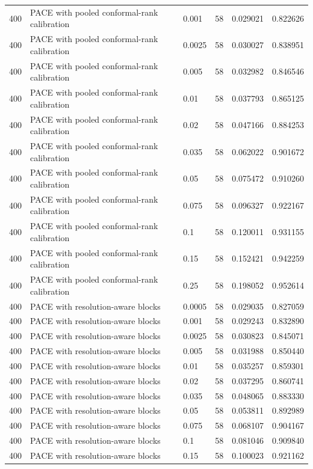 \begin{tabular}{llllll}
400 & PACE with pooled conformal-rank calibration & 0.001 & 58 & 0.029021 & 0.822626 \\
400 & PACE with pooled conformal-rank calibration & 0.0025 & 58 & 0.030027 & 0.838951 \\
400 & PACE with pooled conformal-rank calibration & 0.005 & 58 & 0.032982 & 0.846546 \\
400 & PACE with pooled conformal-rank calibration & 0.01 & 58 & 0.037793 & 0.865125 \\
400 & PACE with pooled conformal-rank calibration & 0.02 & 58 & 0.047166 & 0.884253 \\
400 & PACE with pooled conformal-rank calibration & 0.035 & 58 & 0.062022 & 0.901672 \\
400 & PACE with pooled conformal-rank calibration & 0.05 & 58 & 0.075472 & 0.910260 \\
400 & PACE with pooled conformal-rank calibration & 0.075 & 58 & 0.096327 & 0.922167 \\
400 & PACE with pooled conformal-rank calibration & 0.1 & 58 & 0.120011 & 0.931155 \\
400 & PACE with pooled conformal-rank calibration & 0.15 & 58 & 0.152421 & 0.942259 \\
400 & PACE with pooled conformal-rank calibration & 0.25 & 58 & 0.198052 & 0.952614 \\
400 & PACE with resolution-aware blocks & 0.0005 & 58 & 0.029035 & 0.827059 \\
400 & PACE with resolution-aware blocks & 0.001 & 58 & 0.029243 & 0.832890 \\
400 & PACE with resolution-aware blocks & 0.0025 & 58 & 0.030823 & 0.845071 \\
400 & PACE with resolution-aware blocks & 0.005 & 58 & 0.031988 & 0.850440 \\
400 & PACE with resolution-aware blocks & 0.01 & 58 & 0.035257 & 0.859301 \\
400 & PACE with resolution-aware blocks & 0.02 & 58 & 0.037295 & 0.860741 \\
400 & PACE with resolution-aware blocks & 0.035 & 58 & 0.048065 & 0.883330 \\
400 & PACE with resolution-aware blocks & 0.05 & 58 & 0.053811 & 0.892989 \\
400 & PACE with resolution-aware blocks & 0.075 & 58 & 0.068107 & 0.904167 \\
400 & PACE with resolution-aware blocks & 0.1 & 58 & 0.081046 & 0.909840 \\
400 & PACE with resolution-aware blocks & 0.15 & 58 & 0.100023 & 0.921162 \\

\end{tabular}
